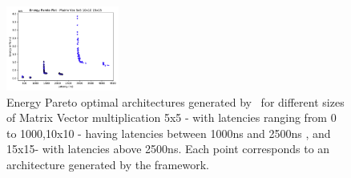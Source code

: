 \begin{figure}[!h] 
\centering
\includegraphics[width=0.33\textwidth]{graphs/EnergyParetoPlotMultipleSizeMAtrixVec.pdf}
    \caption{\small Energy Pareto optimal architectures generated by \frameworkname ~for different sizes of Matrix Vector multiplication 5x5 - with latencies ranging from 0 to 1000,10x10 - having latencies between 1000ns and 2500ns , and 15x15- with latencies above 2500ns. Each point corresponds to an architecture generated by the framework.}
\label{fig:sram_vs_mram_pareto_vec_sizes}
\end{figure}



